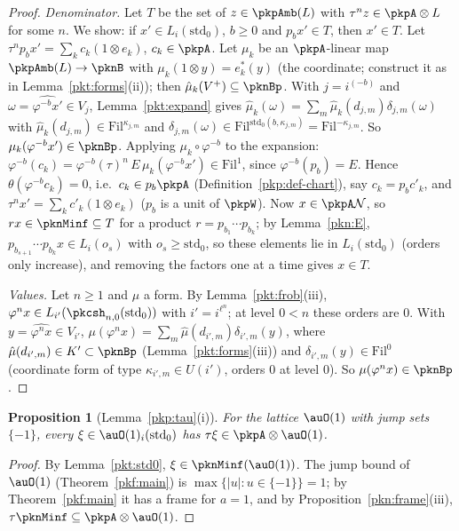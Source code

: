 \documentclass[10pt]{amsart}
\newtheorem{proposition}[theorem]{Proposition}
\theoremstyle{definition}
\theoremstyle{remark}
\begin{document}
\begin{proof}
\emph{Denominator.} Let $T$ be the set of $z\in\pkpAmb(L)$ with $\tau^nz\in\pkpA\otimes L$ for some $n$. We
show: if $x'\in L_i(\mathrm{std}_0)$, $b\ge0$ and $p_bx'\in T$, then $x'\in T$. Let $\tau^np_bx'=\sum_kc_k
(1\otimes e_k)$, $c_k\in\pkpA$. Let $\mu_k$ be an $\pkpA$-linear map $\pkpAmb(L)\to\pknB$ with
$\mu_k(1\otimes y)=e_k^*(y)$ (the coordinate; construct it as in Lemma~\ref{pkt:forms}(ii)); then
$\hat\mu_k(V^+)\subseteq\pknBp$. With $j=i^{(-b)}$ and $\omega=\widehat{\varphi^{-b}x'}\in V_j$,
Lemma~\ref{pkt:expand} gives $\hat\mu_k(\omega)=\sum_m\hat\mu_k(d_{j,m})\delta_{j,m}(\omega)$ with
$\hat\mu_k(d_{j,m})\in\mathrm{Fil}^{\kappa_{j,m}}$ and $\delta_{j,m}(\omega)\in\mathrm{Fil}^{\mathrm{std}_0(b,
\kappa_{j,m})}=\mathrm{Fil}^{-\kappa_{j,m}}$. So $\mu_k(\varphi^{-b}x')\in\pknBp$. Applying $\mu_k\circ\varphi^{-b}$
to the expansion: $\varphi^{-b}(c_k)=\varphi^{-b}(\tau)^n\,E\,\mu_k(\varphi^{-b}x')\in\mathrm{Fil}^1$, since
$\varphi^{-b}(p_b)=E$. Hence $\theta(\varphi^{-b}c_k)=0$, i.e.\ $c_k\in p_b\pkpA$ (Definition~\ref{pkp:def-chart}),
say $c_k=p_bc'_k$, and $\tau^nx'=\sum_kc'_k(1\otimes e_k)$ ($p_b$ is a unit of $\pkpW$). Now $x\in\pkpA\mathcal
N$, so $rx\in\pknMinf\subseteq T$ for a product $r=p_{b_1}\cdots p_{b_k}$; by Lemma~\ref{pkn:E}, $p_{b_{s+1}}
\cdots p_{b_k}x\in L_i(o_s)$ with $o_s\ge\mathrm{std}_0$, so these elements lie in $L_i(\mathrm{std}_0)$ (orders
only increase), and removing the factors one at a time gives $x\in T$.

\emph{Values.} Let $n\ge1$ and $\mu$ a form. By Lemma~\ref{pkt:frob}(iii), $\varphi^nx\in
L_{i'}(\pkcsh_{n,0}(\mathrm{std}_0))$ with $i'=i^{\ell^n}$; at level $0<n$ these orders are $0$. With
$y=\widehat{\varphi^nx}\in V_{i'}$, $\mu(\varphi^nx)=\sum_m\hat\mu(d_{i',m})\delta_{i',m}(y)$, where
$\hat\mu(d_{i',m})\in K'\subset\pknBp$ (Lemma~\ref{pkt:forms}(iii)) and $\delta_{i',m}(y)\in\mathrm{Fil}^0$
(coordinate form of type $\kappa_{i',m}\in U(i')$, orders $0$ at level $0$). So $\mu(\varphi^nx)\in\pknBp$.
\end{proof}

\begin{proposition}[Lemma~\ref{pkp:tau}(i)]\label{pkt:tau-i}
For the lattice $\auO(1)$ with jump sets $\{-1\}$, every $\xi\in\auO(1)_i(\mathrm{std}_0)$ has $\tau\xi\in
\pkpA\otimes\auO(1)$.
\end{proposition}

\begin{proof}
By Lemma~\ref{pkt:std0}, $\xi\in\pknMinf(\auO(1))$. The jump bound of $\auO(1)$ (Theorem~\ref{pkf:main}) is
$\max\{|u|:u\in\{-1\}\}=1$; by Theorem~\ref{pkf:main} it has a frame for $a=1$, and by
Proposition~\ref{pkn:frame}(iii), $\tau\pknMinf\subseteq\pkpA\otimes\auO(1)$.
\end{proof}
\end{document}
